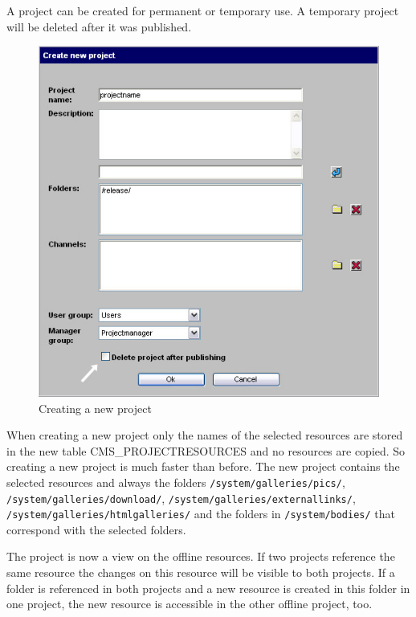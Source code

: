 A project can be created for permanent or temporary use. A
temporary project will be deleted after it was published.

\begin{figure}[hbt]
\begin{center}
\includegraphics[width=\sgw]
                   {pics/newProject/newPro01}
\caption[Creating a new project]
           {Creating a new project}
\label{newproject}
\end{center}
\end{figure}

When creating a new project only the names of the selected
resources are stored in the new table CMS\_PROJECTRESOURCES and no
resources are copied. So creating a new project is much faster
than before. The new project contains the selected resources and
always the folders \texttt{/system/galleries/pics/}, \texttt{/system/galleries/download/}, \texttt{/system/galleries/externallinks/}, 
\texttt{/system/galleries/htmlgalleries/} and  the folders
in \texttt{/system/bodies/} that correspond with the selected folders.

The project is now a view on the offline resources. If two
projects reference the same resource the changes on this resource
will be visible to both projects. If a folder is referenced in
both projects and a new resource is created in this folder in one
project, the new resource is accessible in the other offline project, too.


